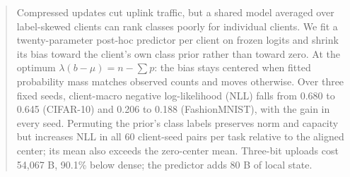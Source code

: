\begin{abstract}
Compressed updates cut uplink traffic, but a shared model averaged over label-skewed clients can rank classes poorly for individual clients. We fit a twenty-param\-eter post-hoc predictor per client on frozen logits and shrink its bias toward the client's own class prior rather than toward zero. At the optimum $\lambda(b-\mu)=n-\sum p$: the bias stays centered when fitted probability mass matches observed counts and moves otherwise. Over three fixed seeds, client-macro negative log-likelihood (NLL) falls from 0.680 to 0.645 (CIFAR-10) and 0.206 to 0.188 (FashionMNIST), with the gain in every seed. Permuting the prior's class labels preserves norm and capacity but increases NLL in all 60 client-seed pairs per task relative to the aligned center; its mean also exceeds the zero-center mean. Three-bit uploads cost 54,067 B, 90.1\% below dense; the predictor adds 80 B of local state.
\end{abstract}
